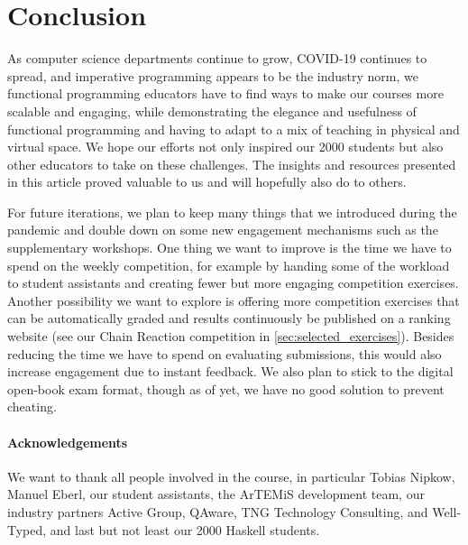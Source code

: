 \section{Conclusion}\label{sec:conclusion}

As computer science departments continue to grow,
COVID-19 continues to spread,
and imperative programming appears to be the industry norm,
we functional programming educators
have to find ways to make our courses more scalable and
engaging, while demonstrating the elegance and usefulness of functional programming and having to adapt to a mix of teaching in physical and virtual space.
We hope our efforts not only inspired our 2000 students
but also other educators to take on these challenges.
The insights and resources presented in this article proved valuable to us and will hopefully also do to others.

For future iterations,
we plan to keep many things that we introduced during the pandemic and double down on some new engagement mechanisms such as the supplementary workshops.
One thing we want to improve is the
time we have to spend on the weekly competition,
for example by handing some of the workload to student assistants and creating fewer but more engaging competition exercises.
Another possibility we want to explore is offering more
competition exercises that can be automatically graded
and results continuously be published on a ranking website (see our Chain Reaction competition in \cref{sec:selected_exercises}).
Besides reducing the time we have to spend on evaluating submissions,
this would also increase engagement due to instant feedback.
We also plan to stick to the digital open-book exam format,
though as of yet, we have no good solution to prevent cheating.

\paragraph{Acknowledgements}
We want to thank all people involved in the course,
in particular Tobias Nipkow,
Manuel Eberl,
our student assistants,
the ArTEMiS development team,
our industry partners
Active Group,
QAware,
TNG Technology Consulting,
and Well-Typed,
and last but not least our 2000 Haskell students.

